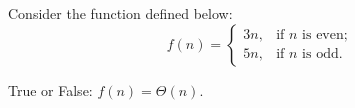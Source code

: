 \Needspace{2in}
\begin{prob}
    Consider the function defined below:
    \[
        f(n) =
        \begin{cases}
            3n, & \text{if $n$ is even;}\\
            5n ,& \text{if $n$ is odd.}
        \end{cases}
    \]

    True or False: $f(n) = \Theta(n)$.

    \Tf{}

\end{prob}

